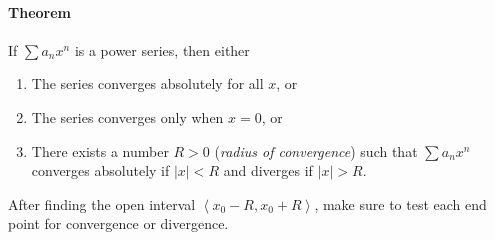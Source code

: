 \documentclass[a4paper,twocolumn,10pt]{article}
\begin{document}
  \paragraph{Theorem} If $\sum a_n x^n$ is a power series, then either
  \begin{enumerate}
    \item The series converges absolutely for all $x$, or
    \item The series converges only when $x=0$, or
    \item There exists a number $R>0$ (\textit{radius of convergence}) such
      that $\sum a_n x^n$ converges absolutely if $|x| < R$ and diverges if
      $|x| > R$.
  \end{enumerate}
  After finding the open interval $\left< x_0-R, x_0+R \right>$, make sure to
  test each end point for convergence or divergence.
\end{document}
